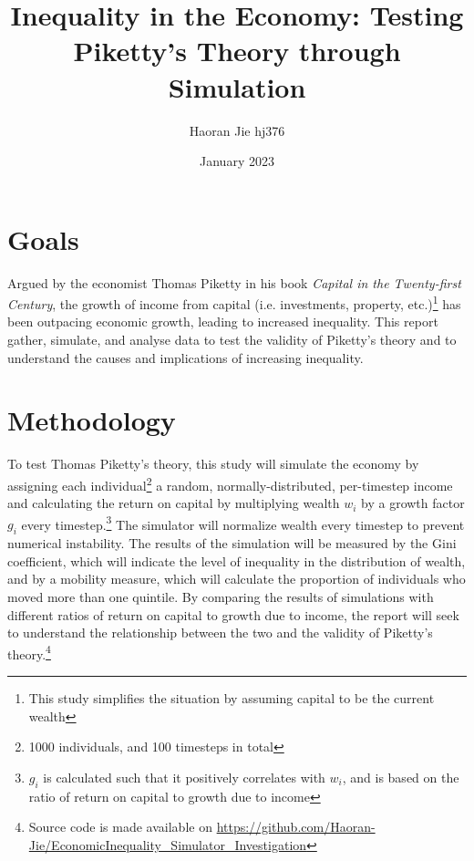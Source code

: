 \documentclass{article}
\title{Inequality in the Economy: Testing Piketty's Theory through Simulation
}
\author{Haoran Jie hj376}
\date{January 2023}
\begin{document}
\maketitle


\section*{Goals}
Argued by the economist Thomas Piketty in his book \textit{Capital in the Twenty-first Century}, the growth of income from capital (i.e. investments, property, etc.)\footnote{This study simplifies the situation by assuming capital to be the current wealth} has been outpacing economic growth, leading to increased inequality. This report gather, simulate, and analyse data to test the validity of Piketty's theory and to understand the causes and implications of increasing inequality.
\vspace{-0.4cm}
\section*{Methodology}
\vspace{-0.3cm}
To test Thomas Piketty's theory, this study will simulate the economy by 
assigning each individual\footnote{1000 individuals, and 100 timesteps in total} a random, normally-distributed, per-timestep income and calculating the return on capital by multiplying wealth $w_i$ by a growth 
factor $g_i$ every timestep.\footnote{$g_i$ is calculated such that it positively correlates with $w_i$, and is based on the ratio of return on capital to growth due to income} The simulator will normalize wealth every timestep to prevent numerical instability. The results of the 
simulation will be measured by the Gini coefficient, which will indicate the level of inequality in the distribution of wealth,
 and by a mobility measure, which will calculate the proportion of individuals who moved more than one quintile. By comparing 
 the results of simulations with different ratios of return on capital to growth due to income, the report will seek to 
 understand the relationship between the two and the validity of Piketty's theory.\footnote{Source code is made available on  \url{https://github.com/Haoran-Jie/EconomicInequality_Simulator_Investigation}}


\vspace{-0.4cm}



\end{document}

